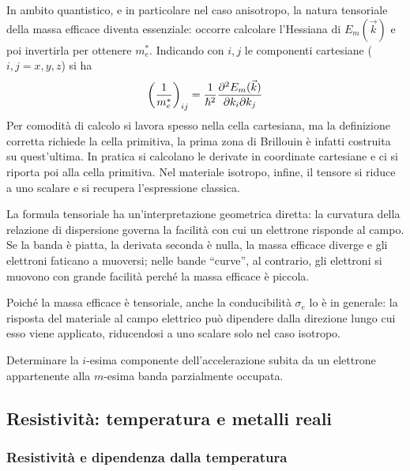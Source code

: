 \begin{attention}
    In ambito quantistico, e in particolare nel caso anisotropo, la natura tensoriale della massa efficace diventa essenziale: occorre calcolare l'Hessiana di \( E_m(\vec{k}) \) e poi invertirla per ottenere \( m_e^* \). Indicando con \( i, j \) le componenti cartesiane (\( i, j = x, y, z \)) si ha
    \begin{equation}
        \left( \frac{1}{m_e^*} \right)_{ij} = \frac{1}{\hbar^2} \pdv{E_m(\vec{k})}{k_i}{k_j}
    \end{equation}
    Per comodità di calcolo si lavora spesso nella cella cartesiana, ma la definizione corretta richiede la cella primitiva, la prima zona di Brillouin è infatti costruita su quest'ultima. In pratica si calcolano le derivate in coordinate cartesiane e ci si riporta poi alla cella primitiva. Nel materiale isotropo, infine, il tensore si riduce a uno scalare e si recupera l'espressione classica.
\end{attention}


La formula tensoriale ha un'interpretazione geometrica diretta: la curvatura della relazione di dispersione governa la facilità con cui un elettrone risponde al campo. Se la banda è piatta, la derivata seconda è nulla, la massa efficace diverge e gli elettroni faticano a muoversi; nelle bande ``curve'', al contrario, gli elettroni si muovono con grande facilità perché la massa efficace è piccola.

Poiché la massa efficace è tensoriale, anche la conducibilità \( \sigma_e \) lo è in generale: la risposta del materiale al campo elettrico può dipendere dalla direzione lungo cui esso viene applicato, riducendosi a uno scalare solo nel caso isotropo.

\begin{exercise}
    Determinare la \( i \)-esima componente dell'accelerazione subita da un elettrone appartenente alla \( m \)-esima banda parzialmente occupata.
\end{exercise}

\subsection{Resistività: temperatura e metalli reali}

\subsubsection{Resistività e dipendenza dalla temperatura}

